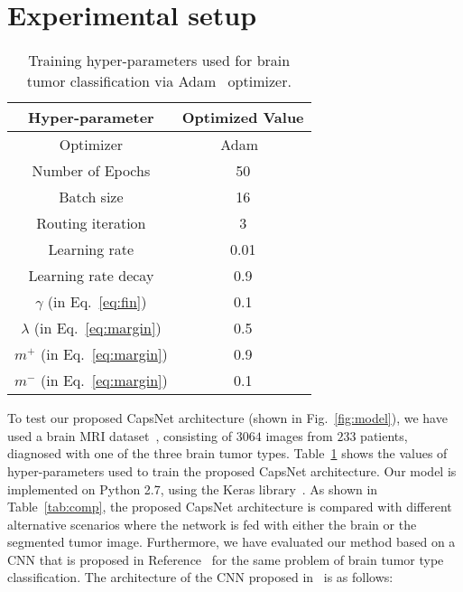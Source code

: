 \documentclass{article}
\begin{document}
\section{Experimental setup} \label{sec:EXP}
\begin{table}[t!]
\caption{\footnotesize Training hyper-parameters used for brain tumor classification via Adam~\cite{adam:2015} optimizer.}
\label{tab:hype}
\vspace{.05in}
\centering
\begin{tabular}{|c|c|}
\hline
\textbf{Hyper-parameter} & \textbf{Optimized Value} \\
\hline
Optimizer & Adam~\cite{adam:2015} \\
\hline\hline
Number of Epochs & 50 \\
Batch size & 16\\
Routing iteration & 3\\
Learning rate & 0.01\\
Learning rate decay & 0.9\\
$\gamma$ (in Eq.~\eqref{eq:fin}) & 0.1\\
$\lambda$ (in Eq.~\eqref{eq:margin}) & 0.5\\
$m^+$ (in Eq.~\eqref{eq:margin}) & 0.9\\
$m^-$ (in Eq.~\eqref{eq:margin}) & 0.1\\
\hline
\end{tabular}
\vspace{-.15in}
\end{table}
To test our proposed CapsNet architecture (shown in Fig.~\ref{fig:model}), we have used a brain MRI dataset~\cite{Cheng:2016}, consisting of $3064$ images from $233$ patients, diagnosed with one of the three brain tumor types. Table~\ref{tab:hype} shows the values of hyper-parameters used to train the proposed CapsNet architecture. Our model is implemented on Python 2.7, using the Keras library~\cite{keras:2016}. As shown in Table~\ref{tab:comp}, the proposed CapsNet architecture is compared with different alternative scenarios where the network is fed with either the brain or the segmented tumor image. Furthermore, we have evaluated our method based on a CNN that is proposed in Reference~\cite{Justin:2017} for the same problem of brain tumor type classification. The architecture of the CNN proposed in~\cite{Justin:2017} is as follows:
\end{document}
